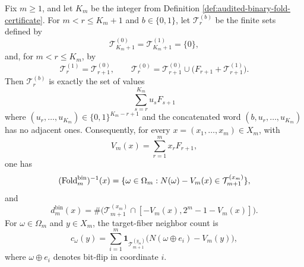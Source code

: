 \begin{lemma}\label{lem:foldbin-fibonacci-tail-prefix-recursion}
Fix \(m\ge1\), and let \(K_m\) be the integer from Definition \ref{def:audited-binary-fold-certificate}.  For \(m<r\le K_m+1\) and \(b\in\{0,1\}\), let \(\mathcal T_r^{(b)}\) be the finite sets defined by
\[
\mathcal T_{K_m+1}^{(0)}=\mathcal T_{K_m+1}^{(1)}=\{0\},
\]
and, for \(m<r\le K_m\), by
\[
\mathcal T_r^{(1)}=\mathcal T_{r+1}^{(0)},
\qquad
\mathcal T_r^{(0)}=
\mathcal T_{r+1}^{(0)}\cup\bigl(F_{r+1}+\mathcal T_{r+1}^{(1)}\bigr).
\]
Then \(\mathcal T_r^{(b)}\) is exactly the set of values
\[
\sum_{s=r}^{K_m} u_sF_{s+1}
\]
where \((u_r,\ldots,u_{K_m})\in\{0,1\}^{K_m-r+1}\) and the concatenated word \((b,u_r,\ldots,u_{K_m})\) has no adjacent ones.  Consequently, for every \(x=(x_1,\ldots,x_m)\in X_m\), with
\[
V_m(x)=\sum_{r=1}^{m}x_rF_{r+1},
\]
one has
\[
(\operatorname{Fold}_m^{\mathrm{bin}})^{-1}(x)
=\{\omega\in\Omega_m:N(\omega)-V_m(x)\in\mathcal T_{m+1}^{(x_m)}\},
\]
and
\[
d_m^{\mathrm{bin}}(x)
=\#\bigl(\mathcal T_{m+1}^{(x_m)}\cap[-V_m(x),2^m-1-V_m(x)]\bigr).
\]
For \(\omega\in\Omega_m\) and \(y\in X_m\), the target-fiber neighbor count is
\[
c_\omega(y)=\sum_{i=1}^{m}\mathbf 1_{\mathcal T_{m+1}^{(y_m)}}
\bigl(N(\omega\oplus e_i)-V_m(y)\bigr),
\]
where \(\omega\oplus e_i\) denotes bit-flip in coordinate \(i\).
\end{lemma}

